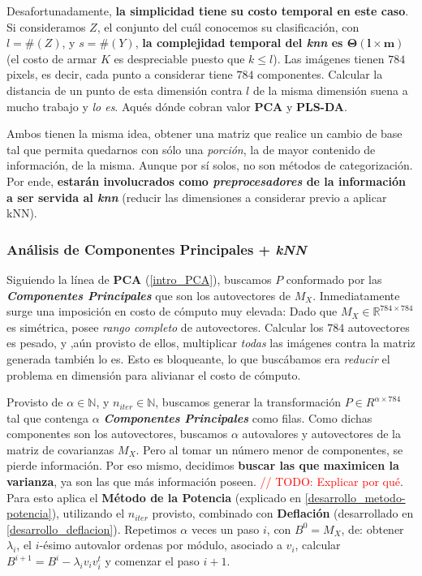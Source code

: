 Desafortunadamente, \textbf{la simplicidad tiene su costo temporal en este caso}. Si consideramos $Z$, el conjunto del cu\'al conocemos su clasificaci\'on, con $l = \#(Z)$, y $s = \#(Y)$, \textbf{la complejidad temporal del \textit{knn} es $\mathbf{\Theta(l \times m)}$} (el costo de armar $K$ es despreciable puesto que $k \leq l$). Las im\'agenes tienen $784$ pixels, es decir, cada punto a considerar tiene $784$ componentes. Calcular la distancia de un punto de esta dimensi\'on contra \textit{$l$} de la misma dimensi\'on suena a mucho trabajo y \textit{lo es}. Aqu\' es d\'onde cobran valor \textbf{PCA} y \textbf{PLS-DA}.

Ambos tienen la misma idea, obtener una matriz que realice un cambio de base tal que permita quedarnos con s\'olo una \textit{porci\'on}, la de mayor contenido de informaci\'on, de la misma. Aunque por s\'i solos, no son m\'etodos de categorizaci\'on. Por ende, \textbf{estar\'an involucrados como \textit{preprocesadores} de la informaci\'on a ser servida al \textit{knn}} (reducir las dimensiones a considerar previo a aplicar kNN).

\subsubsection{An\'alisis de Componentes Principales + \textit{kNN}}

Siguiendo la l\'inea de \textbf{PCA} (\ref{intro_PCA}), buscamos $P$ conformado por las \textit{\textbf{Componentes Principales}} que son los autovectores de $M_{X}$. Inmediatamente surge una imposici\'on en costo de c\'omputo muy elevada: Dado que $M_{X} \in \mathbb{R}^{784 \times 784}$ es sim\'etrica, posee \textit{rango completo} de autovectores. Calcular los $784$ autovectores es pesado, y ,a\'un provisto de ellos, multiplicar \textit{todas} las im\'agenes contra la matriz generada tambi\'en lo es. Esto es bloqueante, lo que busc\'abamos era \textit{reducir} el problema en dimensi\'on para alivianar el costo de c\'omputo.

Provisto de $\alpha \in \mathbb{N}$, y $n_{iter} \in \mathbb{N}$, buscamos generar la transformaci\'on $P \in R^{\alpha \times 784}$ tal que contenga $\alpha$ \textbf{\textit{Componentes Principales}} como filas.
Como dichas componentes son los autovectores, buscamos $\alpha$ autovalores y autovectores de la matriz de covarianzas $M_{X}$. Pero al tomar un n\'umero menor de componentes, se pierde informaci\'on. Por eso mismo, decidimos \textbf{buscar las que maximicen la varianza}, ya son las que m\'as informaci\'on poseen. \textcolor{red}{// TODO: Explicar por qu\'e}. Para esto aplica el \textbf{M\'etodo de la Potencia} (explicado en \ref{desarrollo_metodo-potencia}), utilizando el $n_{iter}$ provisto, combinado con \textbf{Deflaci\'on} (desarrollado en \ref{desarrollo_deflacion}). Repetimos $\alpha$ veces un paso $i$, con $B^0 = M_{X}$, de: obtener $\lambda_{i}$, el $i$-\'esimo autovalor ordenas por m\'odulo, asociado a $v_{i}$, calcular $B^{i + 1} = B^{i} - \lambda_{i}v_{i}v_{i}^{t}$ y comenzar el paso $i+1$.

